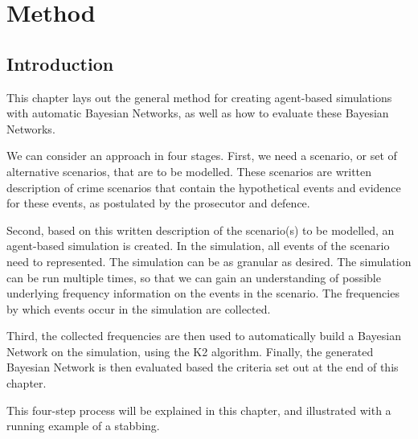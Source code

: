  

\chapter[Method]{Method}

\section{Introduction}

This chapter lays out the general method for creating agent-based simulations with automatic Bayesian Networks, as well as how to evaluate these Bayesian Networks.

We can consider an approach in four stages. First, we need a scenario, or set of alternative scenarios, that are to be modelled. These scenarios are written description of crime scenarios that contain the hypothetical events and evidence for these events, as postulated by the prosecutor and defence. 

Second, based on this written description of the scenario(s) to be modelled, an agent-based simulation is created. In the simulation, all events of the scenario need to represented. The simulation can be as granular as desired. The simulation can be run multiple times, so that we can gain an understanding of possible underlying frequency information on the events in the scenario. The frequencies by which events occur in the simulation are collected.

Third, the collected frequencies are then used to automatically build a Bayesian Network on the simulation, using the K2 algorithm. Finally, the generated Bayesian Network is then evaluated based the criteria set out at the end of this chapter.

This four-step process will be explained in this chapter, and illustrated with a running example of a stabbing.



